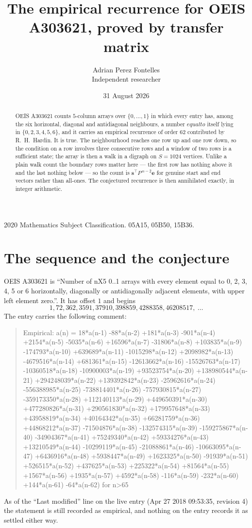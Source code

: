 \documentclass[11pt,a4paper]{article}
\title{The empirical recurrence for OEIS A303621, proved by transfer matrix}
\author{Adrian Perez Fontelles\\ \small Independent researcher}
\date{31 August 2026}
\theoremstyle{plain}
\theoremstyle{definition}
\begin{document}
\maketitle

\begin{abstract}
OEIS A303621 counts $5$-column arrays over $\{0,\dots,1\}$ in which every entry has,
among the six horizontal, diagonal and antidiagonal neighbours, a number $equal to$ itself lying in $\{0,2,3,4,5,6\}$, and it carries an empirical
recurrence of order $62$ contributed by R.~H.~Hardin. It is true. The neighbourhood
reaches one row up and one row down, so the condition on a row involves three consecutive
rows and a window of two rows is a sufficient state; the array is then a walk in a digraph
on $S=1024$ vertices. Unlike a plain walk count the boundary rows matter here --- the first
row has nothing above it and the last nothing below --- so the count is
$\mathbf{s}^{\!\top}P^{\,n-2}\mathbf{e}$ for genuine start and end vectors rather than
all-ones. The conjectured recurrence is then annihilated exactly, in integer arithmetic.
\end{abstract}

\noindent\small 2020 Mathematics Subject Classification. 05A15, 05B50, 15B36.\normalsize

\section{The sequence and the conjecture}

OEIS A303621 is ``Number of nX5 0..1 arrays with every element equal to 0, 2, 3, 4, 5 or 6 horizontally, diagonally or antidiagonally adjacent elements, with upper left element zero.''. It has offset
$1$ and begins
\[
1, 72, 362, 3591, 37910, 398859, 4288358, 46208517,\ \dots
\]
The entry carries the following comment:
\begin{quote}\small
Empirical: a(n) = 18*a(n-1) -88*a(n-2) +181*a(n-3) -901*a(n-4) +2154*a(n-5) -5035*a(n-6) +16596*a(n-7) -31806*a(n-8) +103835*a(n-9) -174793*a(n-10) +639689*a(n-11) -1015298*a(n-12) +2098982*a(n-13) -4679516*a(n-14) +681361*a(n-15) -12613662*a(n-16) -15526763*a(n-17) -10360518*a(n-18) -10900003*a(n-19) +93523754*a(n-20) +138980544*a(n-21) +294248039*a(n-22) +139392842*a(n-23) -25962616*a(n-24) -556388985*a(n-25) -738814401*a(n-26) -757930815*a(n-27) -359173350*a(n-28) +112140113*a(n-29) +449650391*a(n-30) +477280826*a(n-31) +290561830*a(n-32) +179957648*a(n-33) +43958819*a(n-34) +40164342*a(n-35) +66281759*a(n-36) +44868212*a(n-37) -71504876*a(n-38) -132574315*a(n-39) -159275867*a(n-40) -34904367*a(n-41) +75249340*a(n-42) +59334276*a(n-43) +13210549*a(n-44) -10299119*a(n-45) -21088861*a(n-46) -10663095*a(n-47) +6436916*a(n-48) +5938447*a(n-49) +1623325*a(n-50) -91939*a(n-51) +526515*a(n-52) +437625*a(n-53) +225322*a(n-54) +81564*a(n-55) +1567*a(n-56) +1935*a(n-57) +4592*a(n-58) -116*a(n-59) -232*a(n-60) +144*a(n-61) -64*a(n-62) for n>65
\end{quote}
As of the ``Last modified'' line on the live entry (Apr 27 2018 09:53:35, revision
4) the statement is still recorded as empirical, and nothing on the entry
records it as settled either way.
\end{document}
